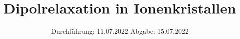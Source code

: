 

\subject{V48}
\title{Dipolrelaxation in Ionenkristallen}
\date{%
  Durchführung: 11.07.2022
  \hspace{3em}
  Abgabe: 15.07.2022
}



\maketitle
\thispagestyle{empty}
\tableofcontents
\newpage





\nocite{*}
\printbibliography{}


